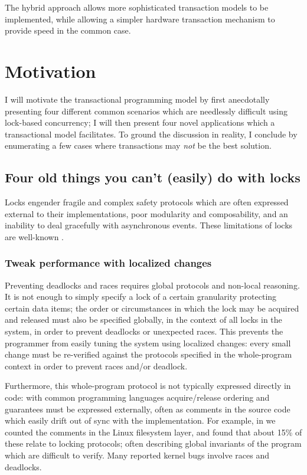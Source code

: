 
The hybrid approach allows more sophisticated transaction models to be
implemented, while allowing a simpler hardware transaction mechanism
to provide speed in the common case.

\section{Motivation}
I will motivate the transactional programming model by first
anecdotally presenting four different common scenarios which are needlessly
difficult using lock-based concurrency; I will then present four novel
applications which a transactional model facilitates.  To ground the
discussion in reality, I conclude by enumerating a few cases where
transactions may \emph{not} be the best solution.

\subsection{Four old things you can't (easily) do with locks}
Locks engender fragile and complex safety protocols which
are often expressed external to their implementations, poor modularity
and composability, and an inability to deal gracefully with
asynchronous events.  These limitations of locks are well-known
\cite{Herlihy05}.

\subsubsection{Tweak performance with localized changes}
Preventing deadlocks and races requires global protocols and non-local
reasoning.  It is not enough to simply specify a lock of a certain
granularity protecting certain data items; the order or circumstances
in which the lock may be acquired and released must also be specified
globally, in the context of all locks in the system, in order to
prevent deadlocks or unexpected races.  This prevents the programmer
from easily tuning the system using localized changes: every small
change must be re-verified against the protocols specified in the
whole-program context in order to prevent races and/or deadlock.

Furthermore, this whole-program protocol is not typically expressed
directly in code: with common programming languages acquire/release
ordering and guarantees must be expressed externally, often as
comments in the source code which easily drift out of sync with the
implementation.  For example, in \cite{AnanianAsKuLeLi04} we counted
the comments in the Linux filesystem layer, and found that about 15\%
of these relate to locking protocols; often describing global
invariants of the program which are difficult to verify.  Many
reported kernel bugs involve races and deadlocks.

